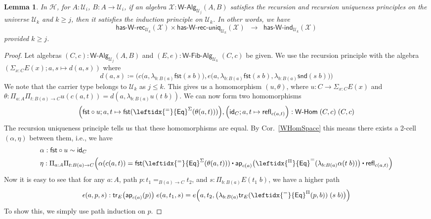 \documentclass[11pt]{article}
\newcommand{\X}{\mathcal{X}}
\newcommand{\fst}{\mathsf{fst}}
\newcommand{\snd}{\mathsf{snd}}
\newcommand{\comp}{\circ}
\newcommand{\idfun}[1]{\mathsf{id}_{#1}}
\newcommand{\prd}[1]{\Pi_{#1}}
\newcommand{\sm}[1]{\Sigma_{#1}}
\newcommand{\lam}[1]{\lambda_{#1}}
\newcommand{\defeq}{\coloneqq}
\newcommand{\refl}{\mathsf{refl}}
\newcommand{\funext}{\leftidx{^\Pi}{\mathsf{Eq}}^{=}}
\newcommand{\happly}{\leftidx{^=}{\mathsf{Eq}}^{\Pi}}
\newcommand{\idtodpair}{\leftidx{^=}{\mathsf{Eq}}^{\Sigma}}
\newcommand{\UU}{\mathcal{U}}
\newcommand{\WAlg}{\mathsf{W}\text{-}\mathsf{Alg}}
\newcommand{\WFibAlg}{\mathsf{W}\text{-}\mathsf{Fib}\text{-}\mathsf{Alg}}
\newcommand{\WHom}{\mathsf{W}\text{-}\mathsf{Hom}}
\newcommand{\HasWRec}{\mathsf{has}\text{-}\mathsf{W}\text{-}\mathsf{rec}}
\newcommand{\HasWInd}{\mathsf{has}\text{-}\mathsf{W}\text{-}\mathsf{ind}}
\newcommand{\HasWRecUniq}{\mathsf{has}\text{-}\mathsf{W}\text{-}\mathsf{rec}\text{-}\mathsf{uniq}}
\newcommand{\app}{\mathsf{ap}}
\newcommand{\trans}{\mathsf{tr}}
\newcommand{\Hint}{\mathcal{H}}
\newcommand{\ct}{%
  \mathchoice{\mathbin{\raisebox{0.5ex}{$\displaystyle\centerdot$}}}%
             {\mathbin{\raisebox{0.5ex}{$\centerdot$}}}%
             {\mathbin{\raisebox{0.25ex}{$\scriptstyle\,\centerdot\,$}}}%
             {\mathbin{\raisebox{0.1ex}{$\scriptscriptstyle\,\centerdot\,$}}}}
\newtheorem{lemma}[theorem]{Lemma}
\theoremstyle{definition}
\begin{document}
\begin{lemma}\label{lem:WRecUniqImpIndInt}
In $\Hint$, for $A:\UU_i$, $B : A \to \UU_i$, if an algebra $\X : \WAlg_{\UU_j}(A,B)$ satisfies the recursion and recursion uniqueness principles on the universe $\UU_k$ and $k \geq j$, then it satisfies the induction principle on $\UU_k$. In other words, we have
\[ \HasWRec_{\UU_k}(\X) \times \HasWRecUniq_{\UU_k}(\X) \;\; \rightarrow \; \; \HasWInd_{\UU_k}(\X) \]
provided $k \geq j$.
\end{lemma}
\begin{proof}
Let algebras $(C,c) : \WAlg_{\UU_j}(A,B)$ and $(E,e) : \WFibAlg_{\UU_k} \; (C,c)$ be given. We use the recursion principle with the algebra $(\sm{x:C} E(x); a,s \mapsto d(a,s))$ where
\[ d(a,s) \defeq \Big(c\big(a,\lam{b:B(a)} \fst(s\;b)\big), e\big(a, \lam{b:B(a)} \fst(s\;b), \lam{b:B(a)} \snd(s\;b)\big) \Big) \]
We note that the carrier type belongs to $\UU_k$ as $j \leq k$. This gives us a homomorphism $(u,\theta)$, where $u : C \to \sm{x:C} E(x)$ and $\theta : \prd{a:A}\prd{t:B(a)\to C} u(c(a,t)) = d(a,\lam{b:B(a)}u(t\;b))$. We can now form two homomorphisms 
\[\Big(\fst \comp u; a,t \mapsto \fst(\idtodpair(\theta(a,t)))\Big), \Big(\idfun{C}; a,t \mapsto \refl_{c(a,t)}\Big) : \WHom \; (C,c) \; (C,c)\]
The recursion uniqueness principle tells us that these homomorphisms are equal. By Cor.~\ref{WHomSpace} this means there exists a 2-cell $(\alpha,\eta)$ between them, i.e., we have 
\begin{align*}
& \alpha : \fst \comp u \sim \idfun{C} \\
& \eta : \prd{a:A}\prd{t:B(a)\to C} \Big(\alpha(c(a,t)) = \fst(\idtodpair(\theta(a,t))) \ct \app_{c(a)}\big(\funext(\lam{b:B(a)} \alpha(t\;b))\big) \ct \refl_{c(a,t)}\Big)
\end{align*}
Now it is easy to see that for any $a : A$, path $p : t_1 =_{B(a) \to C} t_2$, and $s : \prd{b:B(a)} E(t_1 \; b)$, we have a higher path
\[ \epsilon(a,p,s) : \trans_E\big(\app_{c(a)}(p)\big) \; e(a,t_1,s) = e\Big(a,t_2,\big(\lam{b:B(a)} \trans_E(\happly(p,b)) \; (s \; b)\big)\Big) \] 
To show this, we simply use path induction on $p$.


\end{proof}
\end{document}
